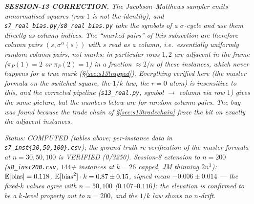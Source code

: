 \emph{\textbf{SESSION-13 CORRECTION.}  The Jacobson--Matthews
sampler emits unnormalised squares (row $1$ is not the identity), and
\texttt{s7\_real\_bias.py}/\texttt{s8\_real\_bias.py} take the
symbols of a $\sigma$-cycle and use them directly as column indices.
The ``marked pairs'' of this subsection are therefore column pairs
$(s,\sigma^\alpha(s))$ with $s$ read as a column, i.e.\ essentially
uniformly random column pairs, not marks: in particular rows $1,2$ are
adjacent in the frame ($\pi_P(1)=2$ or $\pi_P(2)=1$) in a fraction
$\approx2/n$ of these instances, which never happens for a true mark
(\S\ref{sec:s13trapped}).  Everything verified here (the master
formula on the switched square, the $1/k$ law, the $r=0$ atom) is
insensitive to this, and the corrected pipeline
(\texttt{s13\_real.py}, symbol $\to$ column via row $1$) gives the
same picture, but the numbers below are for random column pairs.  The
bug was found because the trade chain of \S\ref{sec:s13tradechain}
froze the bit on exactly the adjacent instances.}

\emph{Status: COMPUTED (tables above; per-instance data in
\texttt{s7\_inst\{30,50,100\}.csv}); the ground-truth re-verification
of the master formula at $n=30,50,100$ is VERIFIED (0/3250).
Session-8 extension to $n=200$ (\texttt{s8\_inst200.csv}, $144$+
instances at $k=26$ capped, JM thinning $2n^3$): $\mathbb{E}|\mathrm{bias}|
=0.118$, $\mathbb{E}[\mathrm{bias}^2]\cdot k=0.87\pm0.15$, signed mean
$-0.006\pm0.014$ --- the fixed-$k$ values agree with $n=50,100$
($0.107$--$0.116$): the elevation is confirmed to be a $k$-level
property out to $n=200$, and the $1/k$ law shows no $n$-drift.}
